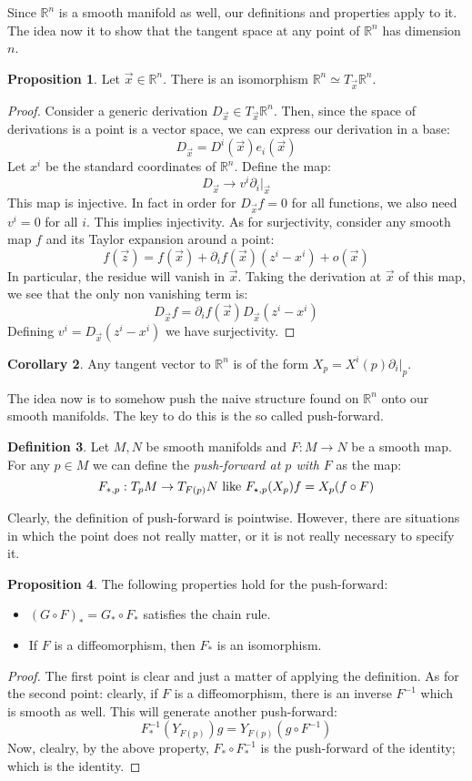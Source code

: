 \documentclass[12pt,a4paper]{report}
\theoremstyle{definition}
\newtheorem{Def}{Definition}[chapter]
\theoremstyle{Theorem}
\newtheorem{Prop}[Def]{Proposition}
\theoremstyle{definition}
\theoremstyle{definition}
\newtheorem{Cor}[Def]{Corollary}
\begin{document}
			Since $\mathbb{R}^n$ is a smooth manifold as well, our definitions and properties apply to it. The idea now it to show that the tangent space at any point of $\mathbb{R}^n$ has dimension $n$.
			\begin{Prop}
				Let $\vec{x}\in\mathbb{R}^n$. There is an isomorphism $\mathbb{R}^n\simeq T_{\vec{x}}\mathbb{R}^n$.
			\end{Prop}
			\begin{proof}
				Consider a generic derivation $D_{\vec{x}}\in T_{\vec{x}}\mathbb{R}^n$. Then, since the space of derivations is a point is a vector space, we can express our derivation in a base:
				$$D_{\vec{x}}=D^i(\vec{x})e_i(\vec{x})$$
				Let $x^i$ be the standard coordinates of $\mathbb{R}^n$. Define the map:
				$$D_{\vec{x}}\longrightarrow v^i\partial_i\big|_{\vec{x}}$$
				This map is injective. In fact in order for  $D_{\vec{x}}f=0$ for all functions, we also need $v^i=0$ for all $i$. This implies injectivity. As for surjectivity, consider any smooth map $f$ and its Taylor expansion around a point:
				$$f(\vec{z})=f(\vec{x})+\partial_i f(\vec{x})(z^i-x^i)+o(\vec{x})$$
				In particular, the residue will vanish in $\vec{x}$. Taking the derivation at $\vec{x}$ of this map, we see that the only non vanishing term is:
				$$D_{\vec{x}}f=\partial_i f(\vec{x})D_{\vec{x}}(z^i-x^i)$$
				Defining $v^i=D_{\vec{x}}(z^i-x^i)$ we have surjectivity.
			\end{proof}
			\begin{Cor}
				Any tangent vector to $\mathbb{R}^n$ is of the form $X_p=X^i(p)\partial_i\big|_p$.
			\end{Cor}
			The idea now is to somehow push the naive structure found on $\mathbb{R}^n$ onto our smooth manifolds. The key to do this is the so called push-forward.
			\begin{Def}
				Let $M,N$ be smooth manifolds and $F:M\rightarrow N$ be a smooth map. For any $p\in M$ we can define the \textit{push-forward at $p$ with $F$} as the map:
				$$F_{*,p}:T_pM\rightarrow T_{F(p)}N\hbox{ like }F_{\star,p}(X_p)f=X_p(f\circ F)$$
			\end{Def}
			Clearly, the definition of push-forward is pointwise. However, there are situations in which the point does not really matter, or it is not really necessary to specify it.
			\begin{Prop}
				The following properties hold for the push-forward:
				\begin{itemize}
					\item $(G\circ F)_*=G_*\circ F_*$ satisfies the chain rule.
					\item If $F$ is a diffeomorphism, then $F_*$ is an isomorphism.
				\end{itemize}
				\begin{proof}
					The first point is clear and just a matter of applying the definition. As for the second point: clearly, if $F$ is a diffeomorphism, there is an inverse $F^{-1}$ which is smooth as well. This will generate another push-forward:
					$$F^{-1}_*(Y_{F(p)})g=Y_{F(p)}(g\circ F^{-1})$$
					Now, clealry, by the above property, $F_*\circ F_*^{-1}$ is the push-forward of the identity; which is the identity.
				\end{proof}
			\end{Prop}
\end{document}
